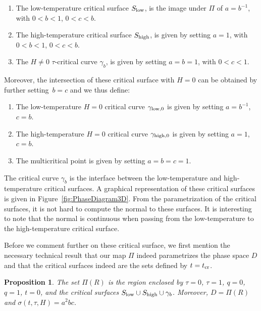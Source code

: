\documentclass[10pt,a4paper]{amsart}
\numberwithin{equation}{section}
\newtheorem{Proposition}[Theorem]{Proposition}
 { \theoremstyle{definition}
\newtheorem{Definition}[Theorem]{Definition}
\newtheorem{Note}[Theorem]{Note}
\newtheorem{Example}[Theorem]{Example}
\newtheorem{Remark}[Theorem]{Remark} }
\begin{document}
 \begin{Definition} \label{defn:criticalsurfaces} \quad
 \begin{enumerate}\itemsep=0pt
 \item[$(1)$] The low-temperature critical surface $S_{{\rm low}}$, is the image under $\Pi$ of ${a=b^{-1}}$, with $0<b <1$, $0<c<b$.
 \item[$(2)$] The high-temperature critical surface $S_{{\rm high}}$, is given by setting $a=1$, with $0 < b < 1$, $0< c < b$.
 \item[$(3)$] The $H\neq 0$ $\tau$-critical curve $\gamma_b$, is given by setting $a=b=1$, with $0 < c <1$.
 \end{enumerate}
 Moreover, the intersection of these critical surface with $H=0$ can be obtained by further setting~${b=c}$ and we thus define:
 \begin{enumerate}\itemsep=0pt
 \item[$(4)$] The low-temperature $H=0$ critical curve $\gamma_{{\rm low},0}$ is given by setting $a=b^{-1}$, $c=b$.
 \item[$(5)$] The high-temperature $H=0$ critical curve $\gamma_{{\rm high},0}$ is given by setting $a=1$, $c=b$.
 \item[$(6)$] The multicritical point is given by setting $a = b = c = 1$.
 \end{enumerate}
 \end{Definition}
 The critical curve $\gamma_b$ is the interface between the low-temperature and high-temperature critical surfaces. A graphical representation of these critical surfaces is given in Figure~\ref{fig:PhaseDiagram3D}. From the parametrization of the critical surfaces, it is not hard to compute the normal to these surfaces. It is interesting to note that the normal is continuous when passing from the low-temperature to the high-temperature critical surface.

 Before we comment further on these critical surface, we first mention the necessary technical result that our map $\Pi$ indeed parametrizes the phase space $ D$ and that the critical surfaces indeed are the sets defined by $t=t_{\rm cr}$.


 \begin{Proposition} \label{prop:phase} The set $\Pi(R)$ is the region enclosed by $\tau=0$, $\tau=1$, $q=0$, $q=1$, $t=0$, and the critical surfaces $S_{{\rm low}}\cup S_{{\rm high}}\cup \gamma_b$. Moreover, $D=\Pi(R)$ and $\sigma(t,\tau,H)=a^2bc$.
 \end{Proposition}
\end{document}
